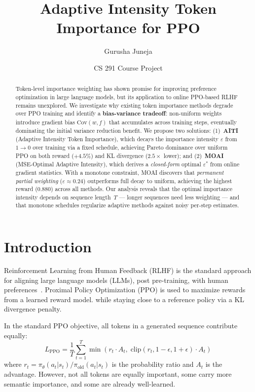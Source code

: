 \documentclass[11pt,a4paper]{article}
\title{Adaptive Intensity Token Importance for PPO}
\author{Gurusha Juneja}
\date{CS 291 Course Project}
\begin{document}
\maketitle

\begin{abstract}
Token-level importance weighting has shown promise for improving preference optimization in large language models, but its application to online PPO-based RLHF remains unexplored. We investigate why existing token importance methods degrade over PPO training and identify a \textbf{bias-variance tradeoff}: non-uniform weights introduce gradient bias $\text{Cov}(w, f)$ that accumulates across training steps, eventually dominating the initial variance reduction benefit. We propose two solutions: (1)~\textbf{AITI} (Adaptive Intensity Token Importance), which decays the importance intensity $\varepsilon$ from $1 \to 0$ over training via a fixed schedule, achieving Pareto dominance over uniform PPO on both reward ($+4.5\%$) and KL divergence ($2.5\times$ lower); and (2)~\textbf{MOAI} (MSE-Optimal Adaptive Intensity), which derives a \emph{closed-form} optimal $\varepsilon^*$ from online gradient statistics. With a monotone constraint, MOAI discovers that \emph{permanent partial weighting} ($\varepsilon \approx 0.24$) outperforms full decay to uniform, achieving the highest reward (0.880) across all methods. Our analysis reveals that the optimal importance intensity depends on sequence length~$T$ --- longer sequences need less weighting --- and that monotone schedules regularize adaptive methods against noisy per-step estimates.
\end{abstract}

\section{Introduction}
\label{sec:intro}

Reinforcement Learning from Human Feedback (RLHF) is the standard approach for aligning large language models (LLMs), post pre-training, with human preferences~\citep{ouyang2022training, schulman2017proximal}. Proximal Policy Optimization (PPO) is used to maximize rewards from a learned reward model. while staying close to a reference policy via a KL divergence penalty.

In the standard PPO objective, all tokens in a generated sequence contribute equally:
\begin{equation}
\label{eq:ppo}
L_{\text{PPO}} = \frac{1}{T} \sum_{t=1}^{T} \min\!\left(r_t \cdot A_t,\; \text{clip}(r_t, 1{-}\epsilon, 1{+}\epsilon) \cdot A_t\right)
\end{equation}
where $r_t = \pi_\theta(a_t|s_t) / \pi_{\text{old}}(a_t|s_t)$ is the probability ratio and $A_t$ is the advantage. However, not all tokens are equally important, some carry more semantic importance, and some are already well-learned.
\end{document}
